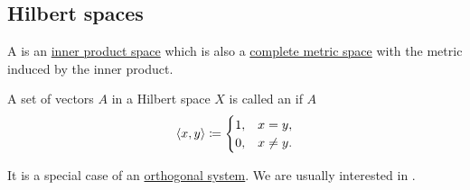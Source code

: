 \subsection{Hilbert spaces}\label{subsec:hilbert_spaces}

\begin{definition}\label{def:hilbert_space}
  A  is an \hyperref[def:inner_product_space]{inner product space} which is also a \hyperref[def:complete_metric_space]{complete metric space} with the metric induced by the inner product.
\end{definition}

\begin{definition}\label{def:orthonormal_system}
  A set of vectors \( A \) in a Hilbert space \( X \) is called an  if \( A \)
  \begin{equation*}
    \left\langle x, y \right\rangle \coloneqq \begin{cases}
      1, &x = y, \\
      0, &x \neq y.
    \end{cases}
  \end{equation*}

  It is a special case of an \hyperref[def:orthogonality]{orthogonal system}. We are usually interested in .
\end{definition}
